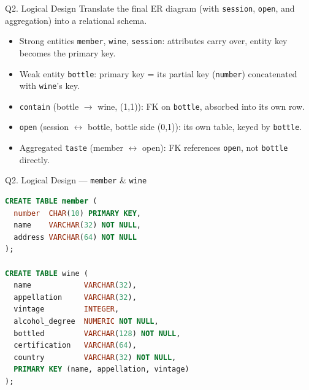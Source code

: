 \documentclass{beamer}
\begin{document}
\begin{frame}
\begin{center}
\end{center}
\end{frame}

\begin{frame}{Q2. Logical Design}
Translate the final ER diagram (with \texttt{session}, \texttt{open}, and aggregation) into a relational schema.
\begin{itemize}
  \item Strong entities \texttt{member}, \texttt{wine}, \texttt{session}: attributes carry over, entity key becomes the primary key.
  \item Weak entity \texttt{bottle}: primary key = its partial key (\texttt{number}) concatenated with \texttt{wine}'s key.
  \item \texttt{contain} (bottle $\to$ wine, (1,1)): FK on \texttt{bottle}, absorbed into its own row.
  \item \texttt{open} (session $\leftrightarrow$ bottle, bottle side (0,1)): its own table, keyed by \texttt{bottle}.
  \item Aggregated \texttt{taste} (member $\leftrightarrow$ open): FK references \texttt{open}, not \texttt{bottle} directly.
\end{itemize}
\end{frame}

\begin{frame}[fragile]{Q2. Logical Design — \texttt{member} \& \texttt{wine}}
\begin{lstlisting}[language=SQL]
CREATE TABLE member (
  number  CHAR(10) PRIMARY KEY,
  name    VARCHAR(32) NOT NULL,
  address VARCHAR(64) NOT NULL
);

CREATE TABLE wine (
  name            VARCHAR(32),
  appellation     VARCHAR(32),
  vintage         INTEGER,
  alcohol_degree  NUMERIC NOT NULL,
  bottled         VARCHAR(128) NOT NULL,
  certification   VARCHAR(64),
  country         VARCHAR(32) NOT NULL,
  PRIMARY KEY (name, appellation, vintage)
);
\end{lstlisting}
\end{frame}
\end{document}
